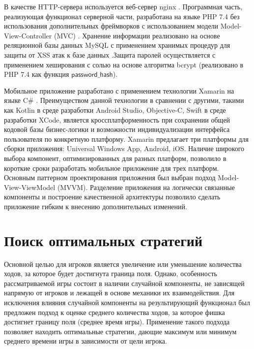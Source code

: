 
В качестве HTTP-сервера используется веб-сервер nginx \cite{reese_nginx_2008}. Программная часть, реализующая функционал серверной части, разработана на языке PHP 7.4 \cite{Nixon_web_2016} без использования дополнительных фреймворков с использованием модели Model-View-Controller (MVC) \cite{pitt_pro_2021}. Хранение информации реализовано на основе реляционной базы данных MySQL с применением хранимых процедур для защиты от XSS атак к базе данных \cite{stuttard_web_2011}.Защита паролей осуществляется с применением хеширования с солью на основе алгоритма bcrypt (реализовано в PHP 7.4 как функция $\mathsf{password\_hash}$).


Мобильное приложение разработано с применением технологии Xamarin на языке C$\mathsf{\#}$ \cite{sole_xamarin_2022}. Преимуществом данной технологии в сравнении с другими, такими как Kotlin в среде разработки Android Studio, Objective-C, Swift в среде разработки XCode, является кроссплатформенность при сохранении общей кодовой базы бизнес-логики и возможности индивидуализации интерфейса пользователя по конкретную платформу. Xamarin предлагает три платформы для сборки приложения: Universal Windows App, Android, iOS. Наличие широкого выбора компонент, оптимизированных для разных платформ, позволило в короткие сроки разработать мобильное приложение для трех платформ. Основным паттерном проектирования приложения был выбран подход Model-View-ViewModel (MVVM). Разделение приложения на логически связанные компоненты и построение качественной архитектуры позволило сделать приложение гибким к внесению дополнительных изменений.


\section{Поиск оптимальных стратегий}\label{sec:ch3/sec3}

Основной целью для игроков является увеличение или уменьшение количества ходов, за которое будет достигнута граница поля. Однако, особенность рассматриваемой игры состоит в наличии случайной компоненты, не зависящей напрямую от игроков и лежащей в основе механики их взаимодействия. Для исключения влияния случайной компоненты на результирующий функционал был предложен подход к оценке среднего количества ходов, за которое фишка достигнет границу поля (среднее время игры). Применение такого подхода позволяет находить оптимальные стратегии, дающие максимум или минимум среднего времени игры в зависимости от цели игрока.

